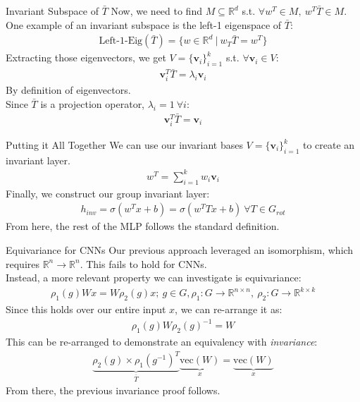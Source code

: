 \documentclass{beamer}
\begin{document}
\begin{frame}{Invariant Subspace of $\bar{T}$}
	Now, we need to find $M \subseteq \mathbb{R}^d$ s.t. $\forall w^T \in M,\ w^T \bar{T} \in M$. \pause \newline \\

	One example of an invariant subspace is the left-1 eigenspace of $\bar{T}$:
	\begin{gather}
		\text{Left-1-Eig}(\bar{T}) = \{ w \in \mathbb{R}^d\ |\ w_T\bar{T} = w^T \}
	\end{gather} \pause
	Extracting those eigenvectors, we get $V = \{\bm{v}_i \}^k_{i=1}$ s.t. $\forall \bm{v}_i \in V$:
	\begin{gather}
		\bm{v}_i^T \bar{T} = \lambda_i \bm{v}_i
	\end{gather}
	By definition of eigenvectors. \pause \newline \\

	Since $\bar{T}$ is a projection operator, $\lambda_i = 1\ \forall i$:
	\begin{gather}
		\bm{v}_i^T \bar{T} = \bm{v}_i
	\end{gather}
\end{frame}

\begin{frame}{Putting it All Together}
	We can use our invariant bases $V = \{\bm{v}_i \}^k_{i=1}$ to create an invariant layer.
	\begin{gather}
		w^T = \sum^k_{i=1} w_i \bm{v}_i
	\end{gather} \pause
	Finally, we construct our group invariant layer:
	\begin{gather}
		h_{inv} = \sigma(w^Tx + b) = \sigma(w^T T x + b)\ \forall T \in G_{rot}
	\end{gather} \pause
	From here, the rest of the MLP follows the standard definition.
\end{frame}

\begin{frame}{Equivariance for CNNs}
	Our previous approach leveraged an isomorphism, which requires $\mathbb{R}^n \rightarrow \mathbb{R}^n$. This fails to hold for CNNs. \pause \newline \\

	Instead, a more relevant property we can investigate is equivariance:
	\begin{gather}
		\rho_1(g) W x = W \rho_2(g) x;\ g \in G, \rho_1: G \rightarrow \mathbb{R}^{n \times n},\ \rho_2: G \rightarrow \mathbb{R}^{k \times k}
	\end{gather} \pause
	Since this holds over our entire input $x$, we can re-arrange it as:
	\begin{gather}
		\rho_1(g) W \rho_2(g)^{-1} = W
	\end{gather} \pause
	This can be re-arranged to demonstrate an equivalency with \textit{invariance}:
	\begin{gather}
		\underbrace{\rho_2(g) \times \rho_1(g^{-1})^T}_{\bar{T}} \underbrace{\text{vec}(W)}_x = \underbrace{\text{vec}(W)}_x
	\end{gather} \pause
	From there, the previous invariance proof follows.
\end{frame}
\end{document}
